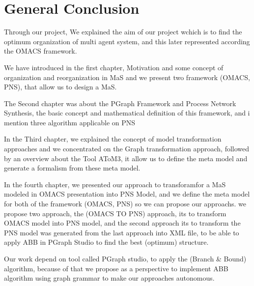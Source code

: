 
\chapter*{General Conclusion}


Through our project, We explained the aim of our project wchich is to find the optimum organization of multi agent system, and this later represented according the OMACS framework.

We have introduced in the first chapter, Motivation and some concept of organization and reorganization in MaS and we present two framework (OMACS, PNS), that allow us to design a MaS.

The Second chapter was about the PGraph Framework and Process Network Synthesis, the basic concept and mathematical definition  of this framework, and i mention 
three algorithm applicable on PNS 

In the Third chapter, we explained the concept of model transformation approaches and we concentrated on the Graph transformation approach, followed by an overview about the Tool AToM3, it allow us to define the meta model and generate a formalism from these meta model.

In the fourth chapter, we presented our approach to transforamfor a MaS modeled in OMACS presentation into PNS Model, and 
we define the meta model for both of the framework (OMACS, PNS) so we can propose our approachs.
we propose two approach, the (OMACS TO PNS) approach, its to transform OMACS model into PNS model, and the second approach its to transform the PNS model was generated from the last approach into XML file, to be able to apply ABB in PGraph Studio to find the best (optimum) structure.

Our work depend on tool called PGraph studio, to apply the (Branch & Bound) algorithm, because of that we propose as a perspective to implement ABB algorithm using graph grammar to make our approaches autonomous.